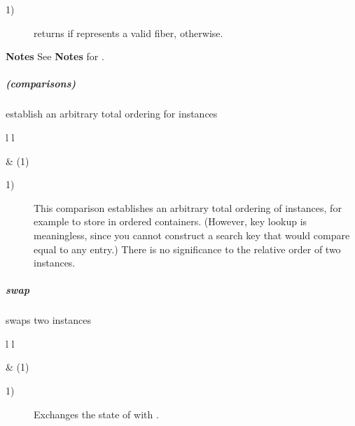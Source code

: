 \begin{description}
    \item[1)] returns  if  represents a valid fiber,
               otherwise.
\end{description}

{\bfseries Notes}
\newline
See {\bfseries Notes} for \opbool.

\subparagraph*{(comparisons)}
establish an arbitrary total ordering for \fiber instances\\

\begin{tabular}{ l l }
    \midrule

     & (1)\\

    \midrule
\end{tabular}

\begin{description}
    \item[1)] This comparison establishes an arbitrary total ordering of \fiber
              instances, for example to store in ordered containers. (However,
              key lookup is meaningless, since you cannot construct a search key
              that would compare equal to any entry.) There is no significance
              to the relative order of two instances.
\end{description}


\subparagraph*{swap}
swaps two \fiber instances\\

\begin{tabular}{ l l }
    \midrule

     & (1)\\

    \midrule
\end{tabular}

\begin{description}
    \item[1)] Exchanges the state of  with .\\
\end{description}
